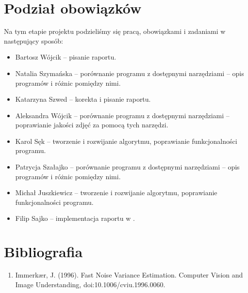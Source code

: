 \documentclass[]{mwart}
\begin{document}
\section{Podział obowiązków}
Na tym etapie projektu podzieliśmy się pracą, obowiązkami i zadaniami w następujący sposób:

\begin{itemize}
    \item Bartosz Wójcik -- pisanie raportu.
    \item Natalia Szymańska -- porównanie programu z dostępnymi narzędziami -- opis programów i różnic pomiędzy nimi. %
    \item Katarzyna Szwed -- korekta i pisanie raportu.
    \item Aleksandra Wójcik -- porównanie programu z dostępnymi narzędziami -- poprawianie jakości zdjęć za pomocą tych narzędzi.
    \item Karol Sęk -- tworzenie i rozwijanie algorytmu, poprawianie funkcjonalności programu.
    \item Patrycja Szałajko -- porównanie programu z dostępnymi narzędziami -- opis programów i różnic pomiędzy nimi.
    \item Michał Juszkiewicz -- tworzenie i rozwijanie algorytmu, poprawianie funkcjonalności programu.
    \item Filip Sajko -- implementacja raportu w \LaTeXe{}.
\end{itemize}


\section{Bibliografia}

\begin{enumerate}
    \item Immerkær, J. (1996). Fast Noise Variance Estimation. Computer Vision and Image Understanding, doi:10.1006/cviu.1996.0060.
\end{enumerate}
\end{document}

